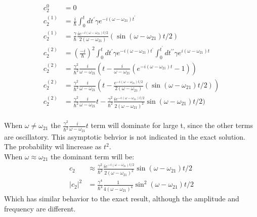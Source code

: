 \documentclass[a4paper,11pt]{article}
\numberwithin{equation}{section}
\begin{document}
\begin{align}
 c_2^0 & =0\\
 c_2^{(1)} &= \frac{i}{\hbar}\int_0^t dt^\prime \gamma e^{-i(\omega-\omega_{21})t^\prime}\\
 c_2^{(1)} &= \frac{\gamma}{\hbar}\frac{ie^{-i(\omega-\omega_{21})t/2}}{2(\omega-\omega_{21})}\left(\sin{(\omega-\omega_{21})t/2}\right)\\
 c_2^{(2)} &= (\frac{-i}{\hbar})^2\int_0^tdt^\prime\gamma e^{-i(\omega-\omega_{21})t^\prime}
	    \int_0^{t^\prime} dt^{\prime\prime} \gamma e^{i(\omega-\omega_{21})t}\\
 c_2^{(2)} &= \frac{\gamma^2}{\hbar^2}\frac{i}{\omega-\omega_{21}}\left(t-\frac{i}{\omega-\omega_{21}}(e^{-i(\omega-\omega_{21})t}-1) \right)\\
 c_2^{(2)} &= \frac{\gamma^2}{\hbar^2}\frac{i}{\omega-\omega_{21}}
	      \left(t-\frac{e^{-i(\omega-\omega_{21})t/2}}{2(\omega-\omega_{21})}(\sin{(\omega-\omega_{21})t/2}) \right)\\
 c_2^{(2)} &= \frac{\gamma^2}{\hbar^2}\frac{i}{\omega-\omega_{21}}t
	      -\frac{\gamma^2}{\hbar^2}\frac{ie^{-i(\omega-\omega_{21})t/2}}{2(\omega-\omega_{21})^2}\sin{(\omega-\omega_{21})t/2})      
\end{align}
\\
When $\omega \ne \omega_{21}$ the $\frac{\gamma^2}{\hbar^2}\frac{i}{\omega-\omega_{21}}t$ term will dominate for large t, since the other terms are oscillatory.
This asymptotic behvior is not indicated in the exact solution. The probability wil lincrease as $t^2$.
\\
When $\omega \approx \omega_{21}$ the dominant term will be:
\begin{align}
 c_2 &\approx \frac{\gamma^2}{\hbar^2}\frac{ie^{-i(\omega-\omega_{21})t/2}}{2(\omega-\omega_{21})^2}\sin{(\omega-\omega_{21})t/2} \\
 |c_2|^2 &= \frac{\gamma^4}{\hbar^4}\frac{1}{4(\omega-\omega_{21})^4}\sin^2{(\omega-\omega_{21})t/2}
\end{align}
Which has similar behavior to the exact result, although the amplitude and frequency are different.
\
\end{document}
